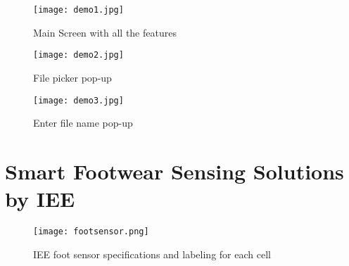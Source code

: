 \begin{figure}[!htb]
  \centering
  \texttt{[image: demo1.jpg]}
  \caption{Main Screen with all the features}
  \label{fig:CustomTableLayout}
\end{figure}

\begin{figure}[!htb]
  \centering
  \texttt{[image: demo2.jpg]}
  \caption{File picker pop-up}
  \label{fig:CustomTableLayout}
\end{figure}

\begin{figure}[!htb]
  \centering
  \texttt{[image: demo3.jpg]}
  \caption{Enter file name pop-up}
  \label{fig:CustomTableLayout}
\end{figure}

\chapter{Smart Footwear Sensing Solutions by IEE}
\makeatletter{}\makeatother
\label{appen:footweardevice}

\begin{figure}[!htb]
  \centering
  \texttt{[image: footsensor.png]}
  \caption{IEE foot sensor specifications and labeling for each cell}
  \label{fig:footsensordevice}
\end{figure}
